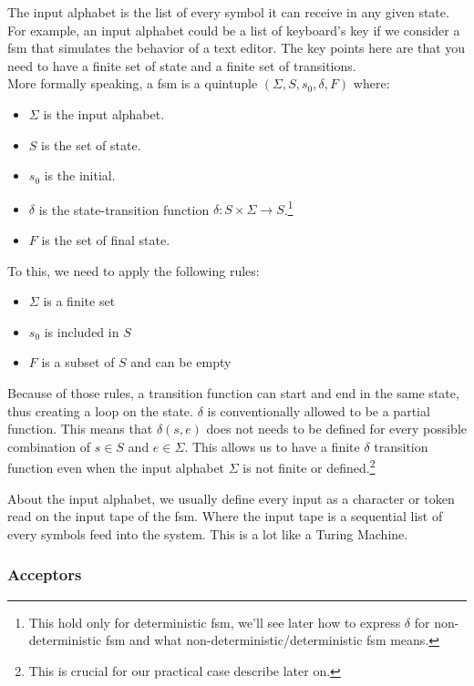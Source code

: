 \documentclass[12pt]{article}
\begin{document}
The input alphabet is the list of every symbol it can receive in any given state. For example, an input alphabet could be a list of keyboard's key if we consider a \gls{fsm} that simulates the behavior of a text editor. The key points here are that you need to have a finite set of state and a finite set of transitions.\\

More formally speaking, a \gls{fsm} is a quintuple $(\Sigma, S, s_{0},\delta, F)$ where:

\begin{itemize}
\item $\Sigma$ is the input alphabet.
\item $S$ is the set of state.
\item $s_{0}$ is the initial.
\item $\delta$ is the state-transition function $\delta:S\times \Sigma \rightarrow S$.\footnote{This hold only for deterministic \gls{fsm}, we'll see later how to express $\delta$ for non-deterministic \gls{fsm} and what non-deterministic/deterministic \gls{fsm} means.}
\item $F$ is the set of final state.
\end{itemize}

To this, we need to apply the following rules:

\begin{itemize}
\item $\Sigma$ is a finite set
\item $s_{0}$ is included in $S$
\item $F$ is a subset of $S$ and can be empty
\end{itemize}

Because of those rules, a transition function can start and end in the same state, thus creating a loop on the state. $\delta$ is conventionally allowed to be a partial function. This means that $\delta(s, e)$ does not needs to be defined for every possible combination of $s \in S$ and $e \in \Sigma$. This allows us to have a finite $\delta$ transition function even when the input alphabet $\Sigma$ is not finite or defined.\footnote{This is crucial for our practical case describe later on.}

About the input alphabet, we usually define every input as a character or token read on the input tape of the \gls{fsm}. Where the input tape is a sequential list of every symbols feed into the system. This is a lot like a Turing Machine.

\subsubsection{Acceptors}
\end{document}
